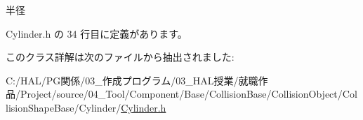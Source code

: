 半径 



 Cylinder.\+h の 34 行目に定義があります。



このクラス詳解は次のファイルから抽出されました\+:\begin{DoxyCompactItemize}
\item 
C\+:/\+H\+A\+L/\+P\+G関係/03\+\_\+作成プログラム/03\+\_\+\+H\+A\+L授業/就職作品/\+Project/source/04\+\_\+\+Tool/\+Component/\+Base/\+Collision\+Base/\+Collision\+Object/\+Collision\+Shape\+Base/\+Cylinder/\mbox{\hyperlink{_cylinder_8h}{Cylinder.\+h}}\end{DoxyCompactItemize}
